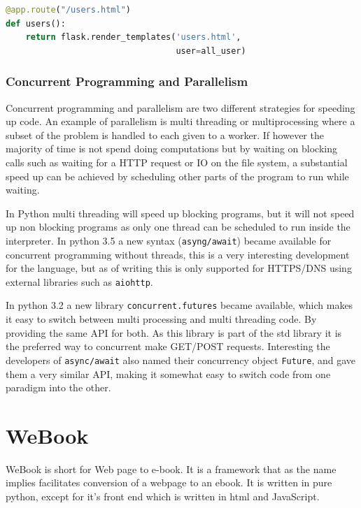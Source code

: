 \documentclass[]{report}   %
\begin{document}
\begin{minipage}{\linewidth}
\begin{lstlisting}[language=python, label={lst:render-template},
                   caption={Flask render\_template, renders a Jinja 2 template}]
@app.route("/users.html")
def users():
    return flask.render_templates('users.html', 
                                  user=all_user)
\end{lstlisting}
\end{minipage}

\subsection{Concurrent Programming and Parallelism}
\label{sec:concurrent_programming}
Concurrent programming and parallelism are two different strategies for
speeding up code. An example of parallelism is multi threading or
multiprocessing where a subset of the problem is handled to each given to a
worker. If however the majority of time is not spend doing computations but by
waiting on blocking calls such as waiting for a HTTP request or IO on the file
system, a substantial speed up can be achieved by scheduling other parts of the
program to run while waiting.

In Python multi threading will speed up blocking programs, but it will not
speed up non blocking programs as only one thread can be scheduled to run
inside the interpreter. In python 3.5 a new syntax (\texttt{asyng/await})
became available for concurrent programming without threads, this is a very
interesting development for the language, but as of writing this is only
supported for HTTPS/DNS using external libraries such as \texttt{aiohttp}. 

In python 3.2 a new library
\texttt{concurrent.futures}\cite{py_concurrent_futures} became available, which
makes it easy to switch between multi processing and multi threading code. By
providing the same API for both. As this library is part of the std library it
is the preferred way to concurrent make GET/POST requests. Interesting the
developers of \texttt{async/await} also named their concurrency object
\texttt{Future}, and gave them a very similar API, making it somewhat easy to
switch code from one paradigm into the other. 


\chapter{WeBook}
WeBook is short for Web page to e-book. It is a framework that as the name
implies facilitates conversion of a webpage to an ebook. It is written in pure
python, except for it's front end which is written in html and JavaScript.
\end{document}
